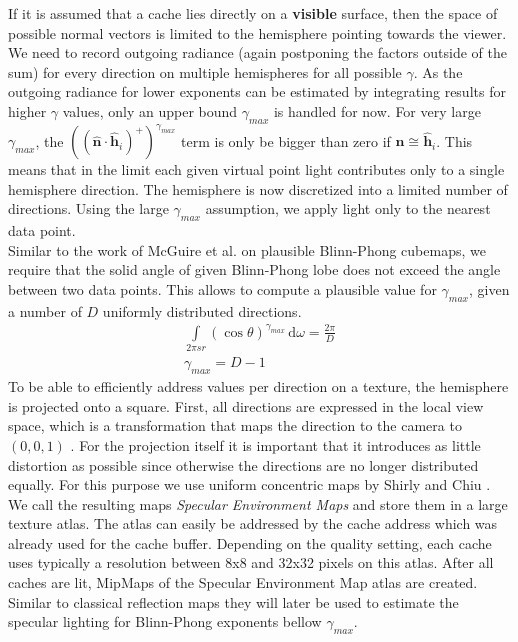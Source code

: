 \documentclass[thesis.tex]{subfiles}
\begin{document}
If it is assumed that a cache lies directly on a \textbf{visible} surface, then the space of possible normal vectors is limited to the hemisphere pointing towards the viewer.
We need to record outgoing radiance (again postponing the factors outside of the sum) for every direction on multiple hemispheres for all possible $\gamma$.
As the outgoing radiance for lower exponents can be estimated by integrating results for higher $\gamma$ values, only an upper bound $\gamma_{max}$ is handled for now.
For very large $\gamma_{max}$, the $((\hat{\mathbf{n}} \cdot \hat{\mathbf{h}}_i)^+)^{\gamma_{max}}$ term is only be bigger than zero if $\hat{\mathbf{n}} \cong \hat{\mathbf{h}}_i$.
This means that in the limit each given virtual point light contributes only to a single hemisphere direction.
The hemisphere is now discretized into a limited number of directions.
Using the large $\gamma_{max}$ assumption, we apply light only to the nearest data point.
\\
Similar to the work of McGuire et al. \cite{bib:envmipmap} on plausible Blinn-Phong cubemaps, we require that the solid angle of given Blinn-Phong lobe does not exceed the angle between two data points.
This allows to compute a plausible value for $\gamma_{max}$, given a number of $D$ uniformly distributed directions.
\begin{align}
\int\limits_{2\pi sr} (\cos\theta)^{\gamma_{max}}  \,\mathrm{d}\omega = \frac{2\pi}{D}\\
\gamma_{max} = D-1
\end{align}
%
To be able to efficiently address values per direction on a texture, the hemisphere is projected onto a square.
First, all directions are expressed in the local view space, which is a transformation that maps the direction to the camera to $(0,0,1)$ .
For the projection itself it is important that it introduces as little distortion as possible since otherwise the directions are no longer distributed equally.
For this purpose we use uniform concentric maps by Shirly and Chiu \cite{bib:concentricmaps}.
We call the resulting maps \emph{Specular Environment Maps} and store them in a large texture atlas.
The atlas can easily be addressed by the cache address which was already used for the cache buffer.
Depending on the quality setting, each cache uses typically a resolution between 8x8 and 32x32 pixels on this atlas.
After all caches are lit, MipMaps of the Specular Environment Map atlas are created.
Similar to classical reflection maps \cite[p.~308]{bib:RealtimeRenderingBook} they will later be used to estimate the specular lighting for Blinn-Phong exponents bellow $\gamma_{max}$.
\end{document}
